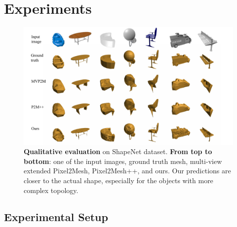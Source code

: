 \section{Experiments}
\begin{figure}[t]
\begin{center}
\includegraphics[width=\linewidth]{imgs/qualitative_evaluation.pdf}
\end{center}
\caption{
    \textbf{Qualitative evaluation} on ShapeNet dataset. \textbf{From top to bottom}: one of the input images, ground truth mesh, multi-view extended Pixel2Mesh, Pixel2Mesh++, and ours.
    Our predictions are closer to the actual shape, especially for the objects with more complex topology.}

\label{fig:qualitative_evaluation}
\end{figure}

\subsection{Experimental Setup}
\label{subsec:experimental_setup}

